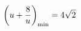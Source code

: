 \documentclass[preview]{standalone}
\begin{document}
\begin{align*}
\special{dvisvgm:raw <g id='unique000'>}\left(u+\frac8u\right)_{\min}=4\sqrt2\special{dvisvgm:raw </g>}
\end{align*}
\end{document}
